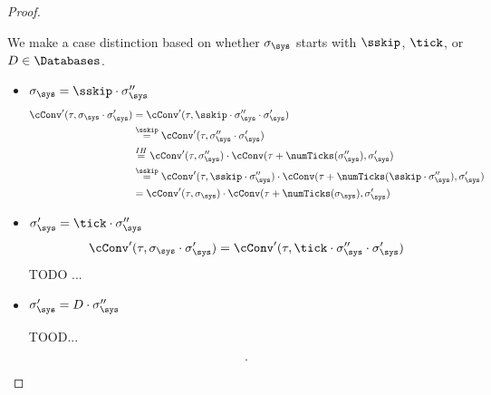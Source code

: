 \begin{proof}
\begin{itemize}
        We make a case distinction based on whether $\sigma_\sys$
        starts with $\sskip$, $\tick$, or $D \in \Databases$.
        \begin{itemize}
            \item $\sigma_\sys = \sskip \cdot \sigma_\sys''$
            \begin{align*}
                \cConv'(\tau, \sigma_\sys \cdot \sigma_\sys')
                &=  \cConv'(\tau, \sskip \cdot \sigma_\sys'' \cdot \sigma_\sys') \\
                &\stackrel{\sskip}{=} 
                    \cConv'(\tau, \sigma_\sys'' \cdot \sigma_\sys') \\
                &\stackrel{IH}{=} \cConv'(\tau, \sigma_\sys'') \cdot
                    \cConv(\tau + \numTicks(\sigma_\sys''), \sigma_\sys') \\
                &\stackrel{\sskip}{=} \cConv'(\tau, \sskip \cdot \sigma_\sys'') 
                \cdot
                \cConv(\tau + \numTicks(\sskip \cdot \sigma_\sys''), \sigma_\sys') \\
                &= \cConv'(\tau, \sigma_\sys) 
                \cdot \cConv(\tau + \numTicks(\sigma_\sys), \sigma_\sys')
            \end{align*}
            \item $\sigma_\sys' = \tick \cdot \sigma_\sys''$
            \begin{align*}
                \cConv'(\tau, \sigma_\sys \cdot \sigma_\sys')
                &=  \cConv'(\tau, \tick \cdot \sigma_\sys'' \cdot \sigma_\sys') \\
            \end{align*}
                TODO ...
            \item $\sigma_\sys' = D \cdot \sigma_\sys''$

            TOOD...

            \begin{equation*}
                .
            \end{equation*}
        \end{itemize}
        
    \end{itemize}
\end{proof}

